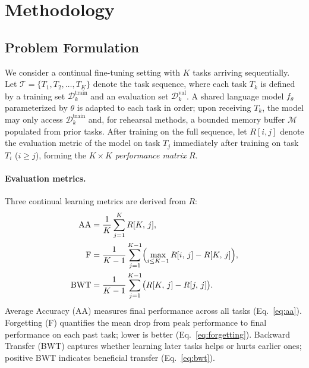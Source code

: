 
\section{Methodology}
\label{sec:method}

\subsection{Problem Formulation}

We consider a continual fine-tuning setting with $K$ tasks arriving sequentially.
Let $\mathcal{T} = \{T_1, T_2, \ldots, T_K\}$ denote the task sequence, where each task $T_k$ is
defined by a training set $\mathcal{D}_k^{\mathrm{train}}$ and an evaluation set
$\mathcal{D}_k^{\mathrm{val}}$.
A shared language model $f_\theta$ parameterized by $\theta$ is adapted to each task in order; upon
receiving $T_k$, the model may only access $\mathcal{D}_k^{\mathrm{train}}$ and, for rehearsal
methods, a bounded memory buffer $\mathcal{M}$ populated from prior tasks.
After training on the full sequence, let $R[i,j]$ denote the evaluation metric of the model on task
$T_j$ immediately after training on task $T_i$ ($i \geq j$), forming the $K \times K$
\emph{performance matrix} $R$.

\paragraph{Evaluation metrics.}
Three continual learning metrics are derived from $R$:
\begin{align}
  \mathrm{AA}  &= \frac{1}{K}   \sum_{j=1}^{K}
                   R[K,\,j],
                   \label{eq:aa} \\
  \mathrm{F}   &= \frac{1}{K-1} \sum_{j=1}^{K-1}
                   \Bigl(\max_{i \leq K-1} R[i,\,j] - R[K,\,j]\Bigr),
                   \label{eq:forgetting} \\
  \mathrm{BWT} &= \frac{1}{K-1} \sum_{j=1}^{K-1}
                   \bigl(R[K,\,j] - R[j,\,j]\bigr).
                   \label{eq:bwt}
\end{align}
Average Accuracy (AA) measures final performance across all tasks (Eq.~\ref{eq:aa}).
Forgetting (F) quantifies the mean drop from peak performance to final performance on each past
task; lower is better (Eq.~\ref{eq:forgetting}).
Backward Transfer (BWT) captures whether learning later tasks helps or hurts earlier ones; positive
BWT indicates beneficial transfer (Eq.~\ref{eq:bwt}).

